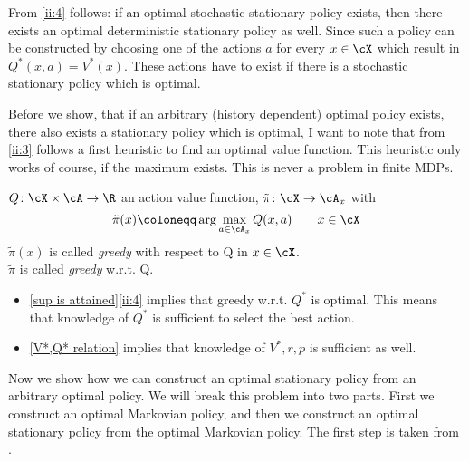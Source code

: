 \begin{remark}\label{opt stat => opt det stat}
	From \ref{ii:4} follows: if an optimal stochastic stationary policy exists, then there exists an optimal deterministic stationary policy as well. Since such a policy can be constructed by choosing one of the actions \(a\) for every \(x\in\cX\) which result in \(Q^*(x,a)=V^*(x)\). These actions have to exist if there is a stochastic stationary policy which is optimal.
\end{remark}
	Before we show, that if an arbitrary (history dependent) optimal policy exists, there also exists a stationary policy which is optimal, I want to note that from \ref{ii:3} follows a first heuristic to find an optimal value function. This heuristic only works of course, if the maximum exists. This is never a problem in finite MDPs. 
\begin{definition}
	\(Q\colon\cX\times\cA\to\R\) an action value function, \(\tilde{\pi}\colon\cX\to\cA_x\) with
	\[
	\tilde{\pi}(x)\coloneqq\arg\max_{a\in\cA_x} Q(x,a)\qquad x\in\cX
	\]
	\(\tilde{\pi}(x)\) is called \emph{greedy} with respect to Q in \(x\in\cX\).\\
	\(\tilde{\pi}\) is called \emph{greedy} w.r.t. Q.
\end{definition}

\begin{remark}\leavevmode
	\begin{itemize}
	\item \ref{sup is attained}\ref{ii:4} implies that greedy w.r.t. \(Q^*\) is optimal. 
	This means that knowledge of \(Q^*\) is sufficient to select the best action.
	\item \ref{V*,Q* relation} implies that knowledge of \(V^*,r,p\) is sufficient as well.
	\end{itemize}
\end{remark}

Now we show how we can construct an optimal stationary policy from an arbitrary optimal policy. We will break this problem into two parts. First we construct an optimal Markovian policy, and then we construct an optimal stationary policy from the optimal Markovian policy. The first step is taken from \textcite[134-137]{putermanMarkovDecisionProcesses2005}.

